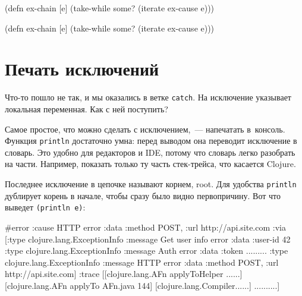 \begin{english}
  \begin{clojure}
(defn ex-chain [e]
  (take-while some?
    (iterate ex-cause e)))
  \end{clojure}
\end{english}

\else

\begin{english}
  \begin{clojure}
(defn ex-chain [e]
  (take-while some? (iterate ex-cause e)))
  \end{clojure}
\end{english}

\fi

\section{Печать исключений}

Что-то пошло не так, и мы оказались в ветке \verb|catch|. На исключение
указывает локальная переменная. Как с ней поступить?

Самое простое, что можно сделать с исключением,~--- напечатать в~консоль. Функция
\verb|println| достаточно умна: перед выводом она переводит исключение в
словарь. Это удобно для редакторов и IDE, потому что словарь легко разобрать на
части. Например, показать только ту часть стек-трейса, что касается Clojure.

Последнее исключение в цепочке называют корнем, root. Для удобства
\verb|println| дублирует корень в начале, чтобы сразу было видно
первопричину. Вот что выведет \verb|(println e)|:


\ifnarrow

\begin{english}
  \begin{clojure}
#error {
 :cause HTTP error
 :data {:method POST,
        :url http://api.site.com}
 :via
 [{:type clojure.lang.ExceptionInfo
   :message Get user info error
   :data {:user-id 42}}
  {:type clojure.lang.ExceptionInfo
   :message Auth error
   :data {:token .........}}
  {:type clojure.lang.ExceptionInfo
   :message HTTP error
   :data {:method POST,
          :url http://api.site.com}}]
 :trace
 [[clojure.lang.AFn applyToHelper ......]
  [clojure.lang.AFn applyTo AFn.java 144]
  [clojure.lang.Compiler......]
  ..........]}
  \end{clojure}
\end{english}

